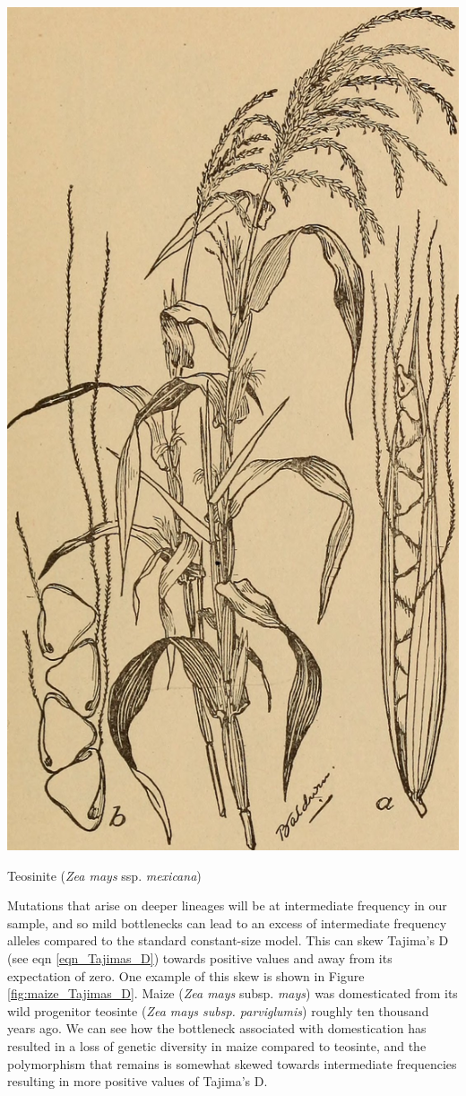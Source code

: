  \begin{marginfigure}[4cm]
 \begin{center}
   \includegraphics[width = 0.7 \textwidth]{illustration_images/Genetic_drift/teosinte/17960129408_21ad0a16f7_k.jpg}

 \end{center}
 \caption{ Teosinite ({\it Zea mays} ssp. {\it  mexicana}) } \label{fig:Teosinite}  %
 \end{marginfigure}  %

Mutations that arise on deeper lineages will be at intermediate frequency in our sample, and so mild bottlenecks
can lead to an excess of intermediate frequency alleles compared to
the standard constant-size model. This can skew
Tajima's D (see eqn \ref{eqn_Tajimas_D}) towards positive values and away from its expectation of
zero. One example of this skew is shown in Figure
\ref{fig:maize_Tajimas_D}. Maize ({\it Zea mays} subsp. {\it mays}) was domesticated from its wild progenitor teosinte ({\it Zea mays
subsp. parviglumis}) roughly ten thousand years ago. We can see how the
 bottleneck associated with domestication has resulted in a loss of genetic diversity in maize compared to teosinte, and the polymorphism that remains is somewhat skewed towards intermediate frequencies resulting in more positive values of Tajima's D.

